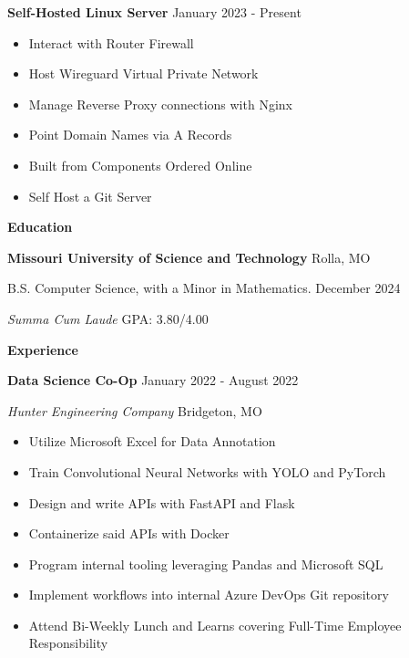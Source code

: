 \documentclass[12pt]{article}
\begin{document}
\textbf{Self-Hosted Linux Server} \hfill January 2023 - Present
\begin{itemize}[noitemsep]
    \item Interact with Router Firewall
    \item Host Wireguard Virtual Private Network
    \item Manage Reverse Proxy connections with Nginx
    \item Point Domain Names via A Records
    \item Built from Components Ordered Online
    \item Self Host a Git Server
\end{itemize}

\begin{center}
    \textbf{Education}
\end{center}
\textbf{Missouri University of Science and Technology} \hfill Rolla, MO

B.S. Computer Science, with a Minor in Mathematics. \hfill December 2024

\textit{Summa Cum Laude} \hfill GPA: 3.80/4.00


\begin{center}
    \textbf{Experience}
\end{center}


\textbf{Data Science Co-Op} \hfill January 2022 - August 2022

\textsl{Hunter Engineering Company} \hfill Bridgeton, MO
\begin{itemize}[noitemsep]
    \item Utilize Microsoft Excel for Data Annotation
    \item Train Convolutional Neural Networks with YOLO and PyTorch
    \item Design and write APIs with FastAPI and Flask
    \item Containerize said APIs with Docker
    \item Program internal tooling leveraging Pandas and Microsoft SQL
    \item Implement workflows into internal Azure DevOps Git repository
    \item Attend Bi-Weekly Lunch and Learns covering Full-Time Employee Responsibility
\end{itemize}

\end{document}
